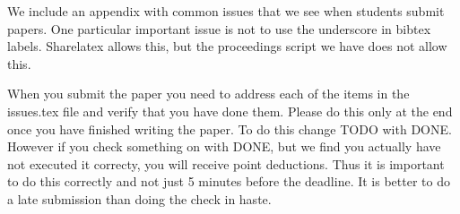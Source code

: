 \documentclass[sigconf]{acmart}
\begin{document}
\appendix

We include an appendix with common issues that we see when students submit papers. One particular important issue is not to use the underscore in bibtex labels. Sharelatex allows this, but the proceedings script we have does not allow this.

When you submit the paper you need to address each of the items in the issues.tex file and verify that you have done them. Please do this only at the end once you have finished writing the paper. To do this change TODO with DONE. However if you check something on with DONE, but we find you actually have not executed it correcty, you will receive point deductions. Thus it is important to do this correctly and not just 5 minutes before the deadline. It is better to do a late
submission than doing the check in haste. 


\end{document}
